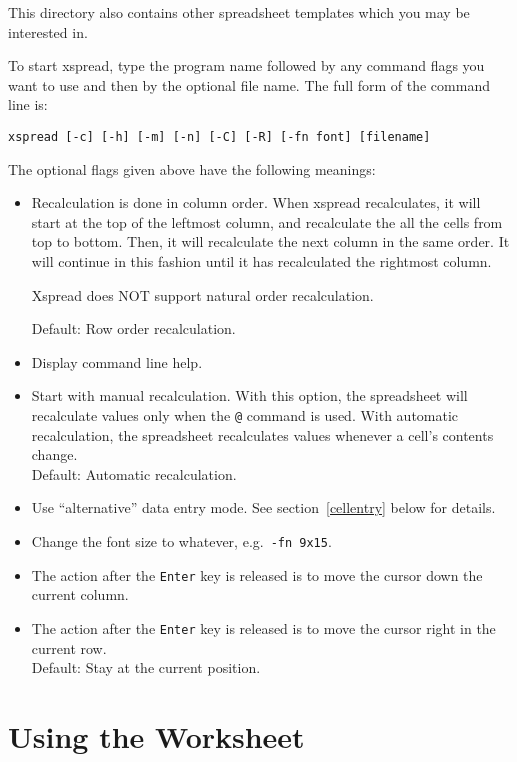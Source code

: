 \documentclass[titlepage]{article}
\newcommand{\titem}[1]{\item[{\tt #1}]}
\begin{document}
This directory also contains other spreadsheet templates which you may
be interested in.

To start \textsf{xspread}, type the program name followed by any
command flags you want to use and then by the optional file name.  The
full form of the command line is:

\begin{center}
  {\tt xspread [-c] [-h] [-m] [-n] [-C] [-R] [-fn font]
    [filename]}
\end{center}

The optional flags given above have the following meanings:

\begin{itemize}
  
  \titem{-c} Recalculation is done in column order.  When
    \textsf{xspread} recalculates, it will start at the top of the
    leftmost column, and recalculate the all the cells from top to
    bottom.  Then, it will recalculate the next column in the same
    order.  It will continue in this fashion until it has recalculated
    the  rightmost column.

    \textsf{Xspread} does NOT support natural order recalculation.

    Default: Row order recalculation.
  
  \titem{-h} Display command line help.
  
  \titem{-m} Start with manual recalculation.  With this option, the
    spreadsheet will recalculate values only when the \texttt{@}
    command is used.  With automatic recalculation, the spreadsheet
    recalculates values whenever a cell's
    contents change.\\
    Default: Automatic recalculation.
  
  \titem{-n} Use ``alternative'' data entry mode.  See
    section~\ref{cellentry} below for details.

  \titem{-fn} Change the font size to whatever, e.g.\ \texttt{-fn 9x15}.
  
  \titem{-C} The action after the {\tt Enter} key is released is to
  move the cursor down the current column.
  
  \titem{-R} The action after the {\tt Enter} key is released is
  to move the cursor right in the current row.\\
  Default: Stay at the current position.
\end{itemize}

\section{Using the Worksheet}
\end{document}

